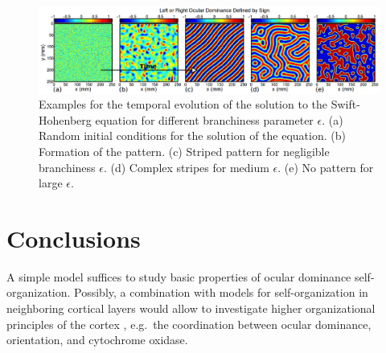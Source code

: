 \documentclass[twocolumn]{bmcart}%
\begin{document}
\begin{figure}[h!]
  \includegraphics[width=.98\textwidth]{ocular_dominace.png}
  \caption{\label{centfig} Examples for the temporal evolution of the 
           solution to the Swift-Hohenberg equation for different 
           branchiness parameter \(\epsilon\).  (a) Random initial 
           conditions for the solution of the equation. (b) Formation of 
           the pattern. (c) Striped pattern for negligible branchiness 
           \(\epsilon\). (d) Complex stripes for medium \(\epsilon\). (e)
           No pattern for large \(\epsilon\).}
\end{figure}

\section{Conclusions}\label{conclusions}

A simple model suffices to study basic properties of ocular dominance
self-organization. Possibly, a combination with models for
self-organization in neighboring cortical layers would allow to
investigate higher organizational principles of the cortex
\cite{Reichl2012}, e.g.~the coordination between ocular dominance,
orientation, and cytochrome oxidase.

\end{document}
